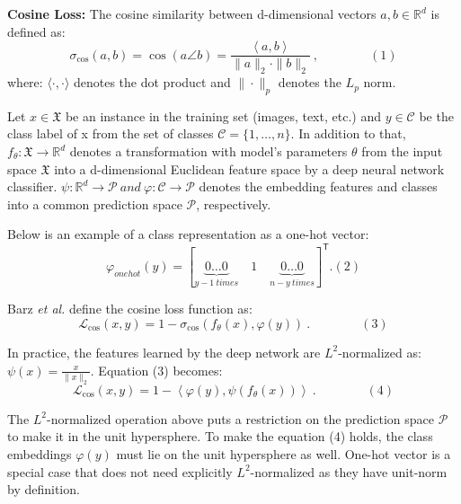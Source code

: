 \documentclass[10pt,twocolumn,letterpaper]{article}
\begin{document}
\textbf{Cosine Loss:} The cosine similarity between d-dimensional vectors $a,b \in \mathbb{R}^d$ is defined as:
\[
\sigma_{\cos}\left(a,b\right)=\cos{\left(a\angle b\right)}=\frac{\left\langle a,b\right\rangle}{\|a\|_2\cdot\|b\|_2} \ ,\qquad\qquad(1)
\]
where: \(\langle\cdot,\cdot\rangle\) denotes the dot product and \(\|\cdot\|_p\) denotes the \(L_p\) norm.
\newline

Let \(x\in\mathfrak{X}\) be an instance in the training set (images, text, etc.) and \(y\in\mathcal{C}\) be the class label of x from the set of classes \(\mathcal{C}=\{1,\ldots,n\}\). In addition to that, \(f_\theta:\mathfrak{X}\rightarrow \mathbb{R}^d\) denotes a transformation with model’s parameters \(\theta\) from the input space \(\mathfrak{X}\) into a d-dimensional Euclidean feature space by a deep neural network classifier. \(\psi: \mathbb{R}^d \rightarrow \mathcal{P} \ and \ \varphi: \mathcal{C} \rightarrow \mathcal{P}\) denotes the embedding features and classes into a common prediction space \(\mathcal{P}\), respectively.
\newline

Below is an example of a class representation as a one-hot vector:
\[
\varphi_{onehot}\left(y\right)=\left[{\underbrace{0\ldots0}}_{y-1\ times}\quad 1\quad {\underbrace{0\ldots0}}_{n-y\ times}\right]^\mathsf{T}.\left(2\right)
\]

Barz \textit{et al.} define the cosine loss function as:
\[
\mathcal{L}_{\cos}\left(x,y\right)=1-\sigma_{\cos}\left(f_\theta\left(x\right),\varphi\left(y\right)\right) \ .\qquad\qquad \left(3\right)
\]

In practice, the features learned by the deep network are \(L^2\)-normalized as: \(\psi\left(x\right)=\frac{x}{\|x\|_2}\). Equation (3) becomes:
\[
\mathcal{L}_{\cos}\left(x,y\right)=1-\left\langle\varphi\left(y\right),\psi\left(f_\theta\left(x\right)\right)\right\rangle\ .\qquad\qquad\left(4\right)
\]

The \(L^2\)-normalized operation above puts a restriction on the prediction space \(\mathcal{P}\) to make it in the unit hypersphere. To make the equation (4) holds, the class embeddings \(\varphi\left(y\right)\) must lie on the unit hypersphere as well. One-hot vector is a special case that does not need explicitly \(L^2\)-normalized as they have unit-norm by definition.
\newline
\end{document}
